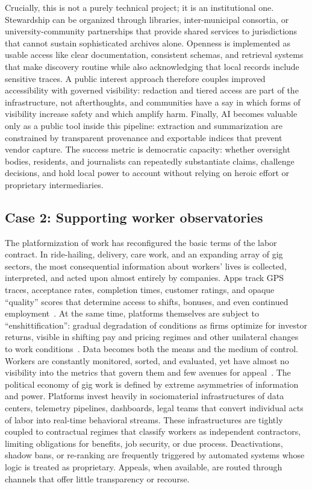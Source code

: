 \documentclass[acmsmall,screen]{acmart}
\begin{document}
Crucially, this is not a purely technical project; it is an institutional one. Stewardship can be organized through libraries, inter-municipal consortia, or university-community partnerships that provide shared services to jurisdictions that cannot sustain sophisticated archives alone. Openness is implemented as usable access like clear documentation, consistent schemas, and retrieval systems that make discovery routine while also acknowledging that local records include sensitive traces. A public interest approach therefore couples improved accessibility with governed visibility: redaction and tiered access are part of the infrastructure, not afterthoughts, and communities have a say in which forms of visibility increase safety and which amplify harm. Finally, AI becomes valuable only as a public tool inside this pipeline: extraction and summarization are constrained by transparent provenance and exportable indices that prevent vendor capture. The success metric is democratic capacity: whether oversight bodies, residents, and journalists can repeatedly substantiate claims, challenge decisions, and hold local power to account without relying on heroic effort or proprietary intermediaries.


\subsection*{Case 2: Supporting worker observatories}

The platformization of work has reconfigured the basic terms of the labor contract. In ride-hailing, delivery, care work, and an expanding array of gig sectors, the most consequential information about workers' lives is collected, interpreted, and acted upon almost entirely by companies. Apps track GPS traces, acceptance rates, completion times, customer ratings, and opaque ``quality'' scores that determine access to shifts, bonuses, and even continued employment~\cite{jarrahiAlgorithmicManagementWork2021}. At the same time, platforms themselves are subject to ``enshittification'': gradual degradation of conditions as firms optimize for investor returns, visible in shifting pay and pricing regimes and other unilateral changes to work conditions~\cite{binnsNotEvenNice2025}. Data becomes both the means and the medium of control. Workers are constantly monitored, sorted, and evaluated, yet have almost no visibility into the metrics that govern them and few avenues for appeal~\cite{jarrahiAlgorithmicManagementWork2021,steinYouAreYou2023}. The political economy of gig work is defined by extreme asymmetries of information and power. Platforms invest heavily in sociomaterial infrastructures of data centers, telemetry pipelines, dashboards, legal teams that convert individual acts of labor into real-time behavioral streams. These infrastructures are tightly coupled to contractual regimes that classify workers as independent contractors, limiting obligations for benefits, job security, or due process. Deactivations, shadow bans, or re-ranking are frequently triggered by automated systems whose logic is treated as proprietary. Appeals, when available, are routed through channels that offer little transparency or recourse.
\end{document}
